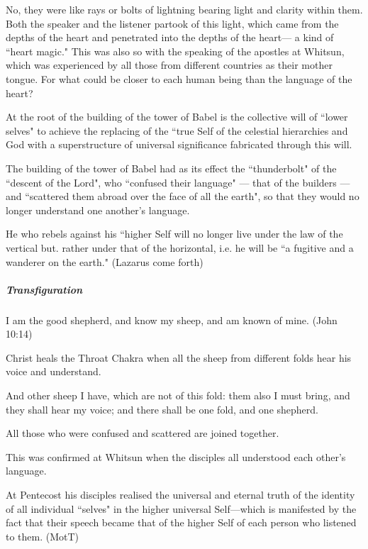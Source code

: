 No, they were like rays or bolts of lightning bearing light and clarity within them. Both the speaker and the listener partook of this light, which came from the depths of the heart and penetrated into the depths of the heart— a kind of ``heart magic." This was also so with the speaking of the apostles at Whitsun, which was experienced by all those from different countries as their mother tongue. For what could be closer to each human being than the language of the heart?

At the root of the building of the tower of Babel is the collective will of ``lower selves" to achieve the replacing of the ``true Self of the celestial hierarchies and God with a superstructure of universal significance fabricated through this will.

The building of the tower of Babel had as its effect the ``thunderbolt" of the ``descent of the Lord", who ``confused their language" — that of the builders — and ``scattered them abroad over the face of all the earth", so that they would no longer understand one another's language.

He who rebels against his ``higher Self will no longer live under the law of the vertical but. rather under that of the horizontal, i.e. he will be ``a fugitive and a wanderer on the earth." (Lazarus come forth)


\subparagraph{Transfiguration}

\begin{quotex}
I am the good shepherd, and know my sheep, and am known of mine. (John 10:14)

\end{quotex}
Christ heals the Throat Chakra when all the sheep from different folds hear his voice and understand.

And other sheep I have, which are not of this fold: them also I must bring, and they shall hear my voice; and there shall be one fold, and one shepherd.

All those who were confused and scattered are joined together.

This was confirmed at Whitsun when the disciples all understood each other's language.


\begin{quotex}
At Pentecost his disciples realised the universal and eternal truth of the identity of all individual ``selves" in the higher universal Self—which is manifested by the fact that their speech became that of the higher Self of each person who listened to them. (MotT)

\end{quotex}

